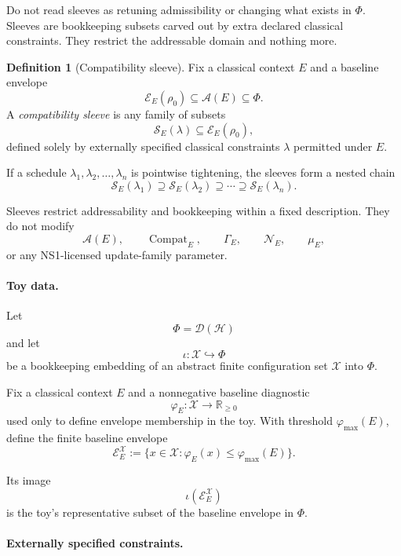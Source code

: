 \documentclass[aps,prx,onecolumn,11pt]{revtex4-2}
\theoremstyle{plain}
\theoremstyle{definition}
\newtheorem{definition}{Definition}
\theoremstyle{remark}
\newcommand{\Compat}{\operatorname{Compat}} %
\begin{document}
Do not read sleeves as retuning admissibility or changing what exists in
\(\Phi\). Sleeves are bookkeeping subsets carved out by extra declared
classical constraints. They restrict the addressable domain and nothing
more.

\begin{definition}[Compatibility sleeve]
Fix a classical context \(E\) and a baseline envelope
\[
\mathcal E_E(\rho_0)\subseteq\mathcal A(E)\subseteq\Phi.
\]
A \emph{compatibility sleeve} is any family of subsets
\[
\mathcal S_E(\lambda)
\subseteq
\mathcal E_E(\rho_0),
\]
defined solely by externally specified classical constraints
\(\lambda\) permitted under \(E\).

If a schedule \(\lambda_1,\lambda_2,\ldots,\lambda_n\) is pointwise
tightening, the sleeves form a nested chain
\[
\mathcal S_E(\lambda_1)
\supseteq
\mathcal S_E(\lambda_2)
\supseteq
\cdots
\supseteq
\mathcal S_E(\lambda_n).
\]

Sleeves restrict addressability and bookkeeping within a fixed
description. They do not modify
\[
\mathcal A(E),
\qquad
\Compat_E,
\qquad
\Gamma_E,
\qquad
\mathcal N_E,
\qquad
\mu_E,
\]
or any NS1-licensed update-family parameter.
\end{definition}

\paragraph{Toy data.}

Let
\[
\Phi=\mathcal D(\mathcal H)
\]
and let
\[
\iota:\mathcal X\hookrightarrow\Phi
\]
be a bookkeeping embedding of an abstract finite configuration set
\(\mathcal X\) into \(\Phi\).

Fix a classical context \(E\) and a nonnegative baseline diagnostic
\[
\varphi_E:\mathcal X\to\mathbb R_{\geq0}
\]
used only to define envelope membership in the toy. With threshold
\(\varphi_{\max}(E)\), define the finite baseline envelope
\begin{equation}
\mathcal E_E^{\mathcal X}
:=
\{
x\in\mathcal X:
\varphi_E(x)\leq\varphi_{\max}(E)
\}.
\label{eq:baseline_envelope}
\end{equation}

Its image
\[
\iota(\mathcal E_E^{\mathcal X})
\]
is the toy's representative subset of the baseline envelope in
\(\Phi\).

\paragraph{Externally specified constraints.}
\end{document}
